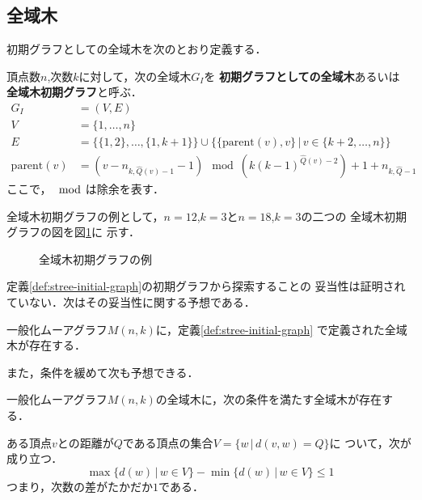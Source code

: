 \subsection{全域木}
\label{subsect:initial-spanning-tree}
初期グラフとしての全域木を次のとおり定義する．
\begin{definition}[初期グラフとしての全域木]\rm
  \label{def:stree-initial-graph}
  頂点数$n$,次数$k$に対して，次の全域木$G_I$を
  \textbf{初期グラフとしての全域木}あるいは
  \textbf{全域木初期グラフ}と呼ぶ．
  \begin{equation}
    \begin{aligned}
      G_I&=(V,E) \\
      V&=\{1,\ldots,n\} \\
      E&=\{\{1,2\},\ldots,\{1,k+1\}\}\cup
      \{\{\text{parent}(v),v\}\,|\,v\in \{k+2,\ldots,n\}\}  \\
      \text{parent}(v)&=
      (v-n_{k,\hat{Q}(v)-1}-1)\mod(k(k-1)^{\hat{Q}(v)-2})+1+n_{k,\hat{Q}-1}
    \end{aligned}
  \end{equation}
  ここで，$\mod$は除余を表す．
\end{definition}
全域木初期グラフの例として，$n=12$,$k=3$と$n=18$,$k=3$の二つの
全域木初期グラフの図を図\ref{fig:initial-spanning-tree-example}に
示す．

\begin{figure}
  \centering
  \hfill
  \caption{全域木初期グラフの例}
  \label{fig:initial-spanning-tree-example}
\end{figure}

定義\ref{def:stree-initial-graph}の初期グラフから探索することの
妥当性は証明されていない．次はその妥当性に関する予想である．
\begin{conjecture}\rm
  \label{conj:spanning-tree}
  一般化ムーアグラフ$M(n,k)$に，定義\ref{def:stree-initial-graph}
  で定義された全域木が存在する．
\end{conjecture}
また，条件を緩めて次も予想できる．
\begin{conjecture}\rm
  \label{conj:spanning-tree-2}
  一般化ムーアグラフ$M(n,k)$の全域木に，次の条件を満たす全域木が存在する．\par
  ある頂点$v$との距離が$Q$である頂点の集合$V=\{w\,|\,d(v,w)=Q\}$に
  ついて，次が成り立つ．
  \[ \max\{d(w)\,|\,w\in V\}-\min\{d(w)\,|\,w\in V\}\leq 1 \]
  つまり，次数の差がたかだか$1$である．
\end{conjecture}

